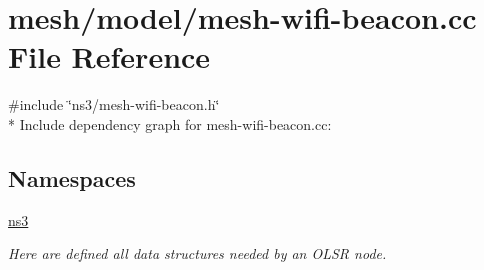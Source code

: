 \hypertarget{mesh-wifi-beacon_8cc}{}\section{mesh/model/mesh-\/wifi-\/beacon.cc File Reference}
\label{mesh-wifi-beacon_8cc}
{\ttfamily \#include \char`\"{}ns3/mesh-\/wifi-\/beacon.\+h\char`\"{}}\\*
Include dependency graph for mesh-\/wifi-\/beacon.cc\+:
\subsection*{Namespaces}
\begin{DoxyCompactItemize}
\item 
 \hyperlink{namespacens3}{ns3}
\begin{DoxyCompactList}\small\item\em Here are defined all data structures needed by an O\+L\+SR node. \end{DoxyCompactList}\end{DoxyCompactItemize}
